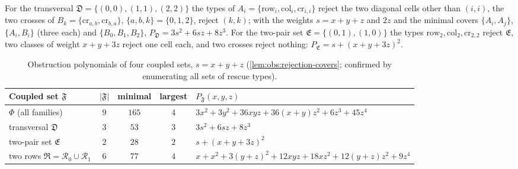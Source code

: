 For the transversal $\mathfrak D=\{(0,0),(1,1),(2,2)\}$ the types of
$A_i=\{\mathrm{row}_i,\mathrm{col}_i,\mathrm{cr}_{i,i}\}$ reject the two
diagonal cells other than $(i,i)$, the two crosses of
$B_k=\{\mathrm{cr}_{a,b},\mathrm{cr}_{b,a}\}$, $\{a,b,k\}=\{0,1,2\}$, reject
$(k,k)$; with the weights $s=x+y+z$ and $2z$ and the minimal covers
$\{A_i,A_j\}$, $\{A_i,B_i\}$ (three each) and $\{B_0,B_1,B_2\}$,
$P_{\mathfrak D}=3s^2+6sz+8z^3$. For the two-pair set
$\mathfrak E=\{(0,1),(1,0)\}$ the types $\mathrm{row}_2,\mathrm{col}_2,
\mathrm{cr}_{2,2}$ reject $\mathfrak E$, two classes of weight $x+y+3z$ reject
one cell each, and two crosses reject nothing: $P_{\mathfrak E}=s+(x+y+3z)^2$.

\begin{table}[ht]
\centering
\small
\caption{Obstruction polynomials of four coupled sets, $s=x+y+z$
(\cref{lem:obs:rejection-covers}; confirmed by enumerating all sets of rescue
types).}
\label{tab:obs:polynomials}
\begin{tabular}{@{}>{\raggedright\arraybackslash}p{}ccc
                 >{\raggedright\arraybackslash}p{}@{}}
\toprule
Coupled set $\mathfrak F$ & $|\mathfrak F|$ & minimal & largest &
$P_{\mathfrak F}(x,y,z)$\\
\midrule
$\Phi$ (all families) & $9$ & $165$ & $4$ &
$3x^2+3y^2+36xyz+36(x+y)z^2+6z^3+45z^4$\\
transversal $\mathfrak D$ & $3$ & $53$ & $3$ & $3s^2+6sz+8z^3$\\
two-pair set $\mathfrak E$ & $2$ & $28$ & $2$ & $s+(x+y+3z)^2$\\
two rows $\mathfrak R=\mathcal R_0\cup\mathcal R_1$ & $6$ & $77$ & $4$ &
$x+x^2+3(y+z)^2+12xyz+18xz^2$\newline${}+12(y+z)z^2+9z^4$\\
\bottomrule
\end{tabular}
\end{table}

